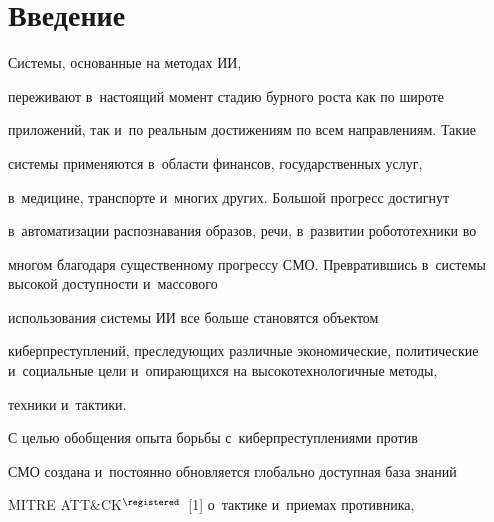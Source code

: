 








 \thispagestyle{headings}

 

 \vspace*{-12pt}



\section{Введение}



\vspace*{-4pt}





    Системы, основанные на методах ИИ, 

переживают в~настоящий момент стадию бурного роста как по широте 

приложений, так и~по реальным достижениям по всем направлениям. Такие 

системы применяются в~области финансов, государственных услуг, 

в~медицине, транспорте и~многих других. Большой прогресс достигнут 

в~автоматизации распознавания образов, речи, в~развитии робототехники во 

многом благодаря существенному прогрессу СМО. Превратившись в~сис\-те\-мы высокой доступности и~массового 

использования системы ИИ все больше становятся объектом 

киберпреступлений, преследующих различные экономические, политические и~социальные цели и~опирающихся на высокотехнологичные методы, 

техники и~тактики.

    

     С целью обобщения опыта борьбы с~киберпреступлениями против 

СМО создана и~постоянно обновляется глобально доступная база знаний 

MITRE ATT\&CK$^\registered$~[1] о~тактике и~приемах противника, 

